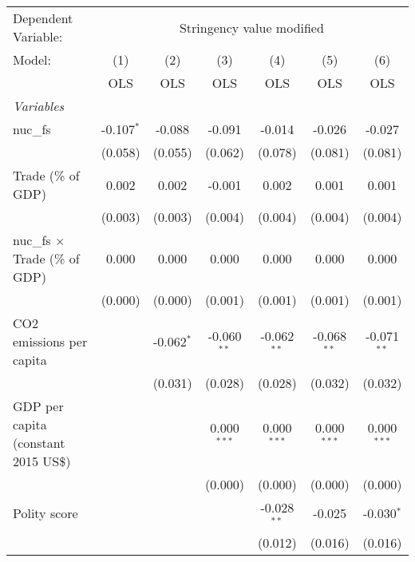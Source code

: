 
\begingroup
\centering
\begin{tabular}{lcccccc}
   \toprule
   Dependent Variable: & \multicolumn{6}{c}{Stringency value modified}\\
   Model:                                & (1)          & (2)          & (3)           & (4)           & (5)           & (6)\\  
                                         &  OLS         & OLS          & OLS           & OLS           & OLS           & OLS\\  
   \midrule
   \emph{Variables}\\
   nuc\_fs                               & -0.107$^{*}$ & -0.088       & -0.091        & -0.014        & -0.026        & -0.027\\   
                                         & (0.058)      & (0.055)      & (0.062)       & (0.078)       & (0.081)       & (0.081)\\   
   Trade (\% of GDP)                     & 0.002        & 0.002        & -0.001        & 0.002         & 0.001         & 0.001\\   
                                         & (0.003)      & (0.003)      & (0.004)       & (0.004)       & (0.004)       & (0.004)\\   
   nuc\_fs $\times$ Trade (\% of GDP)    & 0.000        & 0.000        & 0.000         & 0.000         & 0.000         & 0.000\\   
                                         & (0.000)      & (0.000)      & (0.001)       & (0.001)       & (0.001)       & (0.001)\\   
   CO2 emissions per capita              &              & -0.062$^{*}$ & -0.060$^{**}$ & -0.062$^{**}$ & -0.068$^{**}$ & -0.071$^{**}$\\   
                                         &              & (0.031)      & (0.028)       & (0.028)       & (0.032)       & (0.032)\\   
   GDP per capita (constant 2015 US\$)   &              &              & 0.000$^{***}$ & 0.000$^{***}$ & 0.000$^{***}$ & 0.000$^{***}$\\   
                                         &              &              & (0.000)       & (0.000)       & (0.000)       & (0.000)\\   
   Polity score                          &              &              &               & -0.028$^{**}$ & -0.025        & -0.030$^{*}$\\   
                                         &              &              &               & (0.012)       & (0.016)       & (0.016)\\   

\end{tabular}
